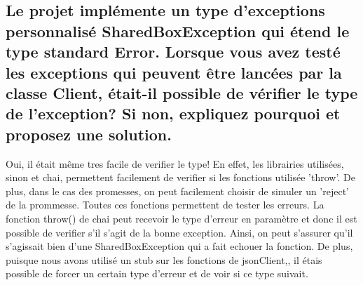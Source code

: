 \documentclass{article}
\begin{document}
\subsection*{Le projet implémente un type d’exceptions personnalisé SharedBoxException
  qui étend le type standard Error. Lorsque vous avez testé les exceptions qui
  peuvent être lancées par la classe Client, était-il possible de vérifier le type de
  l’exception? Si non, expliquez pourquoi et proposez une solution.}
Oui, il était même tres facile de verifier le type!
En effet, les librairies utilisées, sinon et chai, permettent facilement de verifier si les fonctions utilisée 'throw'.
De plus, dans le cas des promesses, on peut facilement choisir de simuler un 'reject' de la prommesse.
Toutes ces fonctions permettent de tester les erreurs.
La fonction throw() de chai peut recevoir le type d'erreur en paramètre et donc il est possible de verifier s'il s'agit de la bonne exception.
Ainsi, on peut s'assurer qu'il s'agissait bien d'une SharedBoxException qui a fait echouer la fonction.
De plus, puisque nous avons utilisé un stub sur les fonctions de jsonClient,, il étais possible de forcer un certain type d'erreur et de voir si ce type suivait.
\end{document}

